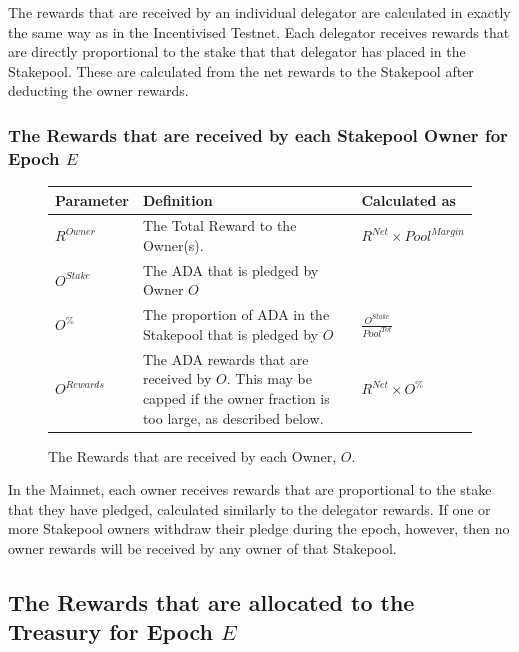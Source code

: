 \documentclass[11pt,a4paper,dvipsnames,twosided,final]{article}
\newcommand{\khcomment}[1]{\todo[color=blue!20]{KH: #1}}
\newcommand{\ada}{ADA{}}
\begin{document}
\noindent
The rewards that are received by an individual delegator are calculated in exactly the same way as in
the Incentivised Testnet.  Each delegator receives rewards that are directly proportional to the
stake that that delegator has placed in the Stakepool.  These are calculated from the net rewards to the
Stakepool after deducting the owner rewards.

\clearpage
\subsubsection*{The Rewards that are received by each Stakepool Owner for Epoch $E$}


\begin{figure}[h!]
\begin{center}
\begin{tabular}{||l|p{9cm}|l||}
  \hline \hline
\textbf{Parameter}  & \textbf{Definition} & \textbf{Calculated as} \\\hline
$R^\textit{Owner}$ & The Total Reward to the Owner(s).  & $R^{\textit{Net}} \times {\textit{Pool}}^{\textit{Margin}}$ \\\hline
$O^\textit{Stake}$ & The \ada{} that is pledged by Owner $O$ & \\\hline
$O^\%$ & The proportion of \ada{} in the Stakepool that is pledged by $O$ & $\frac{O^{Stake}}{Pool^{Tot}}$ \\\hline
$O^{Rewards}$ & The \ada{} rewards that are received by $O$. This may be capped if the owner fraction is too large,
as described below. & $R^{\textit{Net}} \times O^\%$ \\\hline
\hline
\end{tabular}
\end{center}
\caption{The Rewards that are received by each Owner, $O$.}
\end{figure}

\noindent
In the Mainnet, each owner receives rewards that are proportional to the stake that they have pledged,
calculated similarly to the delegator rewards.  If one or more Stakepool owners withdraw their pledge during the epoch,
however, then no owner rewards will be received by any owner of that Stakepool.


\clearpage
\subsection{The Rewards that are allocated to the Treasury for Epoch $E$}
\end{document}
